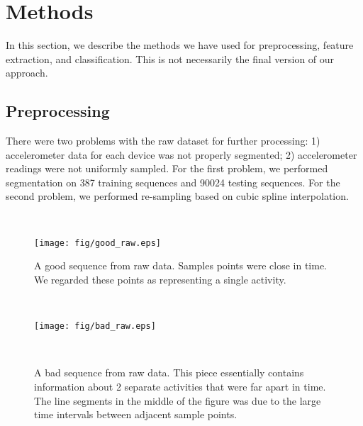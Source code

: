 \documentclass{article} %
\begin{document}
\section{Methods}
In this section, we describe the methods we have used for preprocessing, feature extraction, and classification. This is not necessarily the final version of our approach. 


\subsection{Preprocessing}
There were two problems with the raw dataset for further processing: 1) accelerometer data for each device was not properly segmented; 2) accelerometer readings were not uniformly sampled. For the first problem, we performed segmentation on 387 training sequences and 90024 testing sequences. For the second problem, we performed re-sampling based on cubic spline interpolation.

\begin{figure}
    \hspace{-0.5cm}
    \begin{minipage}[t]{0.02\textwidth}~
    \end{minipage}
    \begin{minipage}[t]{0.47\textwidth}
    \centering
    \texttt{[image: fig/good\_raw.eps]}
    \caption{A good sequence from raw data. Samples points were close in time. We regarded these points as representing a single activity.}
    \label{fig:good_raw}
    \end{minipage}
    \begin{minipage}[t]{0.02\textwidth}~
    \end{minipage}
    \begin{minipage}[t]{0.47\textwidth}
    \centering
    \texttt{[image: fig/bad\_raw.eps]}\\
    \caption{A bad sequence from raw data. This piece essentially contains information about 2 separate activities that were far apart in time. The line segments in the middle of the figure was due to the large time intervals between adjacent sample points.}
    \label{fig:bad_raw}
    \end{minipage}
    \begin{minipage}[t]{0.02\textwidth}~
    \end{minipage}%
 \end{figure}
\end{document}
